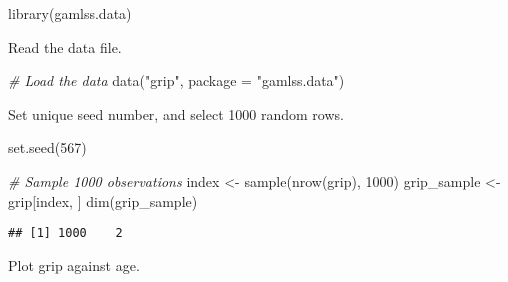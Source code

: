 \documentclass[
]{article}
\newenvironment{Shaded}{\begin{snugshade}}{\end{snugshade}}
\newcommand{\AttributeTok}[1]{\textcolor[rgb]{0.77,0.63,0.00}{#1}}
\newcommand{\CommentTok}[1]{\textcolor[rgb]{0.56,0.35,0.01}{\textit{#1}}}
\newcommand{\DecValTok}[1]{\textcolor[rgb]{0.00,0.00,0.81}{#1}}
\newcommand{\FunctionTok}[1]{\textcolor[rgb]{0.00,0.00,0.00}{#1}}
\newcommand{\NormalTok}[1]{#1}
\newcommand{\OtherTok}[1]{\textcolor[rgb]{0.56,0.35,0.01}{#1}}
\newcommand{\SpecialCharTok}[1]{\textcolor[rgb]{0.00,0.00,0.00}{#1}}
\newcommand{\StringTok}[1]{\textcolor[rgb]{0.31,0.60,0.02}{#1}}
\begin{document}
\begin{Shaded}
\begin{Highlighting}[]
\FunctionTok{library}\NormalTok{(gamlss.data)}
\end{Highlighting}
\end{Shaded}

Read the data file.

\begin{Shaded}
\begin{Highlighting}[]
\CommentTok{\# Load the data}
\FunctionTok{data}\NormalTok{(}\StringTok{"grip"}\NormalTok{, }\AttributeTok{package =} \StringTok{"gamlss.data"}\NormalTok{)}
\end{Highlighting}
\end{Shaded}

Set unique seed number, and select 1000 random rows.

\begin{Shaded}
\begin{Highlighting}[]
\FunctionTok{set.seed}\NormalTok{(}\DecValTok{567}\NormalTok{) }

\CommentTok{\# Sample 1000 observations}
\NormalTok{index }\OtherTok{\textless{}{-}} \FunctionTok{sample}\NormalTok{(}\FunctionTok{nrow}\NormalTok{(grip), }\DecValTok{1000}\NormalTok{)}
\NormalTok{grip\_sample }\OtherTok{\textless{}{-}}\NormalTok{ grip[index, ]}
\FunctionTok{dim}\NormalTok{(grip\_sample)}
\end{Highlighting}
\end{Shaded}

\begin{verbatim}
## [1] 1000    2
\end{verbatim}

Plot grip against age.

\begin{Shaded}
\end{Shaded}
\end{document}
